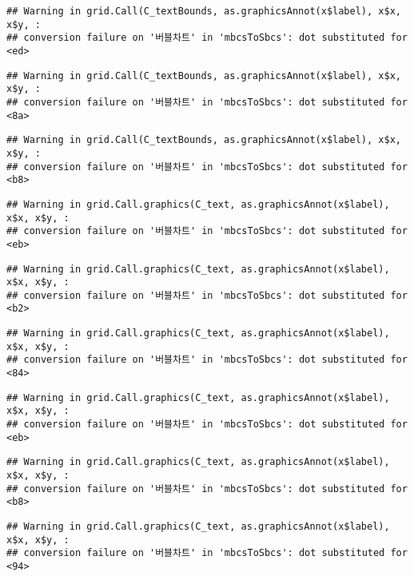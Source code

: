 \documentclass[
]{article}
\begin{document}
\begin{verbatim}
## Warning in grid.Call(C_textBounds, as.graphicsAnnot(x$label), x$x, x$y, :
## conversion failure on '버블차트' in 'mbcsToSbcs': dot substituted for <ed>
\end{verbatim}

\begin{verbatim}
## Warning in grid.Call(C_textBounds, as.graphicsAnnot(x$label), x$x, x$y, :
## conversion failure on '버블차트' in 'mbcsToSbcs': dot substituted for <8a>
\end{verbatim}

\begin{verbatim}
## Warning in grid.Call(C_textBounds, as.graphicsAnnot(x$label), x$x, x$y, :
## conversion failure on '버블차트' in 'mbcsToSbcs': dot substituted for <b8>
\end{verbatim}

\begin{verbatim}
## Warning in grid.Call.graphics(C_text, as.graphicsAnnot(x$label), x$x, x$y, :
## conversion failure on '버블차트' in 'mbcsToSbcs': dot substituted for <eb>
\end{verbatim}

\begin{verbatim}
## Warning in grid.Call.graphics(C_text, as.graphicsAnnot(x$label), x$x, x$y, :
## conversion failure on '버블차트' in 'mbcsToSbcs': dot substituted for <b2>
\end{verbatim}

\begin{verbatim}
## Warning in grid.Call.graphics(C_text, as.graphicsAnnot(x$label), x$x, x$y, :
## conversion failure on '버블차트' in 'mbcsToSbcs': dot substituted for <84>
\end{verbatim}

\begin{verbatim}
## Warning in grid.Call.graphics(C_text, as.graphicsAnnot(x$label), x$x, x$y, :
## conversion failure on '버블차트' in 'mbcsToSbcs': dot substituted for <eb>
\end{verbatim}

\begin{verbatim}
## Warning in grid.Call.graphics(C_text, as.graphicsAnnot(x$label), x$x, x$y, :
## conversion failure on '버블차트' in 'mbcsToSbcs': dot substituted for <b8>
\end{verbatim}

\begin{verbatim}
## Warning in grid.Call.graphics(C_text, as.graphicsAnnot(x$label), x$x, x$y, :
## conversion failure on '버블차트' in 'mbcsToSbcs': dot substituted for <94>
\end{verbatim}
\end{document}
